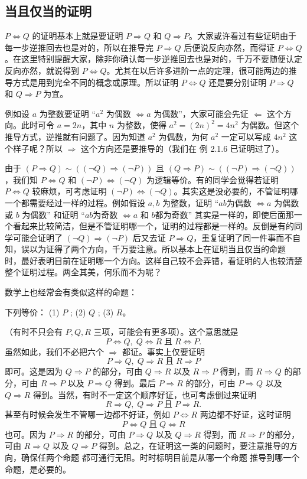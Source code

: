 \subsection{当且仅当的证明}

$P \Leftrightarrow Q$ 的证明基本上就是要证明 $P \Rightarrow Q$ 和 $Q \Rightarrow P$。大家或许看过有些证明由于每一步逆推回去也是对的，所以在推导完 $P \Rightarrow Q$ 后便说反向亦然，而得证 $P \Leftrightarrow Q$。在这里特别提醒大家，除非你确认每一步逆推回去也是对的，千万不要随便认定反向亦然，就说得到 $P \Leftrightarrow Q$。尤其在以后许多进阶一点的定理，很可能两边的推导方式是用到完全不同的概念或原理。所以证明 $P \Leftrightarrow Q$ 还是要分别证明 $P \Rightarrow Q$ 和 $Q \Rightarrow P$ 为宜。

例如设 $a$ 为整数要证明 “$a^2$ 为偶数 $\Leftrightarrow a$ 为偶数”，大家可能会先证 $\Leftarrow$ 这个方向。此时可令 $a = 2n$，其中 $n$ 为整数，使得 $a^2 = (2n)^2 = 4n^2$ 为偶数。但这个推导方式，逆推就有问题了。因为知道 $a^2$ 为偶数，为何 $a^2$ 一定可以写成 $4n^2$ 这个样子呢？所以 $\Rightarrow$ 这个方向还是要推导的（我们在 例 2.1.6 已证明过了）。

由于 $(P\Rightarrow Q)\sim ((\neg Q)\Rightarrow (\neg P))$ 且 $(Q\Rightarrow P)\sim ((\neg P)\Rightarrow (\neg Q))$，我们知 $P\Leftrightarrow Q$ 和 $(\neg P)\Leftrightarrow (\neg Q)$ 为逻辑等价。有的同学会觉得若证明 $P\Leftrightarrow Q$ 较麻烦，可考虑证明 $(\neg P)\Leftrightarrow (\neg Q)$。其实这是没必要的，不管证明哪一个都需要经过一样的过程。例如假设 $a,b$ 为整数，证明 “$ab$为偶数 $\Leftrightarrow a$ 为偶数或 $b$ 为偶数” 和证明 “$ab$为奇数 $\Leftrightarrow a$ 和 $b$都为奇数” 其实是一样的，即使后面那一个看起来比较简洁，但是不管证明哪一个，证明的过程都是一样的。反倒是有的同学可能会证明了 $(\neg Q)\Rightarrow (\neg P)$ 后又去证 $P\Rightarrow Q$，重复证明了同一件事而不自知，误以为证得了两个方向，千万要注意。所以基本上在证明当且仅当的命题 时，最好表明目前在证明哪一个方向。这样自己较不会弄错，看证明的人也较清楚整个证明过程。两全其美，何乐而不为呢？

数学上也经常会有类似这样的命题：
\begin{center}
    下列等价： (1) $P$ ; (2) $Q$ ; (3) $R$。
\end{center}
（有时不只会有 $P,Q,R$ 三项，可能会有更多项）。这个意思就是
$$P\Leftrightarrow Q,\; Q\Leftrightarrow R\; \text{且}\; R\Leftrightarrow P.$$
虽然如此，我们不必把六个 $\Rightarrow$ 都证。事实上仅要证明
$$P\Rightarrow Q,\; Q\Rightarrow R\; \text{且}\; R\Rightarrow P$$
即可。这是因为 $Q\Rightarrow P$ 的部分，可由 $Q\Rightarrow R$ 以及 $R\Rightarrow P$ 得到，而 $R\Rightarrow Q$ 的部分，可由 $R\Rightarrow P$ 以及 $P\Rightarrow Q$ 得到。最后 $P\Rightarrow R$ 的部分，可由 $P\Rightarrow Q$ 以及 $Q\Rightarrow R$ 得到。当然，有时不一定这个顺序好证，也可考虑倒过来证明
$$R\Rightarrow Q,\; Q\Rightarrow P\; \text{且}\; P\Rightarrow R.$$
甚至有时候会发生不管哪一边都不好证，例如 $P\Leftrightarrow R$ 两边都不好证，这时证明
$$P\Leftrightarrow Q\; \text{且}\; Q\Leftrightarrow R$$
也可。因为 $P\Rightarrow R$ 的部分，可由 $P\Rightarrow Q$ 以及 $Q\Rightarrow R$ 得到，而 $R\Rightarrow P$ 的部分，可由 $R\Rightarrow Q$ 以及 $Q\Rightarrow P$ 得到。总之，在证明这一类的问题时，要注意推导的方向，确保任两个命题 都可通行无阻。时时标明目前是从哪一个命题 推导到哪一个命题，是必要的。

